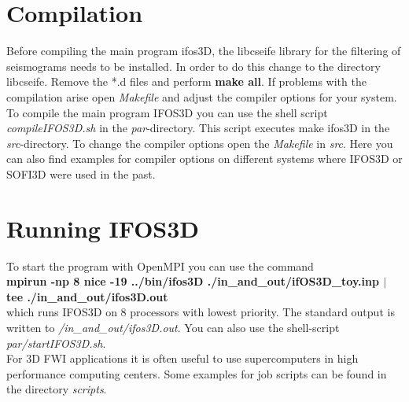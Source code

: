 \section{Compilation}
Before compiling the main program ifos3D, the libcseife library for the filtering of seismograms needs to be installed. In order to do this change to the directory libcseife. Remove the *.d files and perform \textbf{make all}. If problems with the compilation arise open \textit{Makefile} and adjust the compiler options for your system.\\
To compile the main program IFOS3D you can use the shell script \textit{compileIFOS3D.sh} in the \textit{par}-directory. This script executes make ifos3D in the \textit{src}-directory. To change the compiler options open the \textit{Makefile} in \textit{src}. Here you can also find examples for compiler options on different systems where IFOS3D or SOFI3D were used in the past.
\section{Running IFOS3D}
To start the program with OpenMPI you can use the command\\
\textbf{mpirun -np 8 nice -19 ../bin/ifos3D ./in\_and\_out/ifOS3D\_toy.inp $\mid$ tee ./in\_and\_out/ifos3D.out}\\
which runs IFOS3D on 8 processors with lowest priority. The standard output is written to \textit{/in\_and\_out/ifos3D.out}. You can also use the shell-script \textit{par/startIFOS3D.sh}.\\
For 3D FWI applications it is often useful to use supercomputers in high performance computing centers. Some examples for job scripts can be found in the directory \textit{scripts}.
